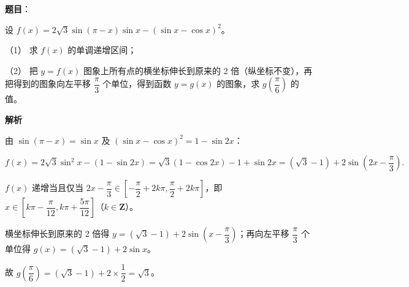 \begin{answer}

\textbf{题目}：

设 \(f(x)=2\sqrt{3}\sin(\pi-x)\sin x-(\sin x-\cos x)^2\)。

（1） 求 \(f(x)\) 的单调递增区间；

（2） 把 \(y=f(x)\) 图象上所有点的横坐标伸长到原来的 2 倍（纵坐标不变），再把得到的图象向左平移 \(\dfrac{\pi}{3}\) 个单位，得到函数 \(y=g(x)\) 的图象，求 \(g\left(\dfrac{\pi}{6}\right)\) 的值。

\textbf{解析}


由 \(\sin(\pi-x)=\sin x\) 及 \((\sin x-\cos x)^{2}=1-\sin 2x\)：

\nopagebreak[4]
\[
f(x)=2\sqrt{3}\sin^{2}x-(1-\sin 2x)=\sqrt{3}(1-\cos 2x)-1+\sin 2x=(\sqrt{3}-1)+2\sin\left(2x-\dfrac{\pi}{3}\right).
\]

\(f(x)\) 递增当且仅当 \(2x-\dfrac{\pi}{3}\in\left[-\dfrac{\pi}{2}+2k\pi,\dfrac{\pi}{2}+2k\pi\right]\)，即 \(x\in\left[k\pi-\dfrac{\pi}{12},k\pi+\dfrac{5\pi}{12}\right]\)（\(k\in\mathbf{Z}\)）。


横坐标伸长到原来的 \(2\) 倍得 \(y=(\sqrt{3}-1)+2\sin\left(x-\dfrac{\pi}{3}\right)\)；再向左平移 \(\dfrac{\pi}{3}\) 个单位得 \(g(x)=(\sqrt{3}-1)+2\sin x\)。

故 \(g\left(\dfrac{\pi}{6}\right)=(\sqrt{3}-1)+2\times\dfrac{1}{2}=\sqrt{3}\)。



\end{answer}
